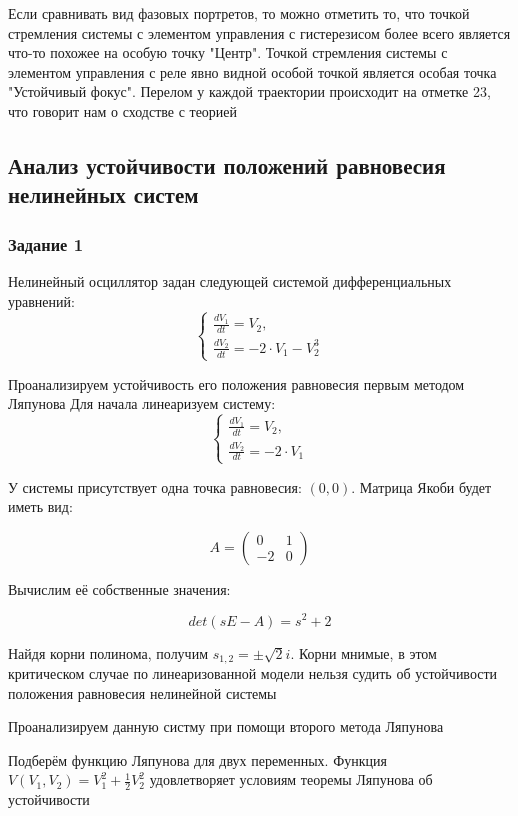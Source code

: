 Если сравнивать вид фазовых портретов, то можно отметить то, что точкой стремления системы с элементом управления
с гистерезисом более всего является что-то похожее на особую точку "Центр". Точкой стремления системы с элементом управления
с реле явно видной особой точкой является особая точка "Устойчивый фокус". Перелом у каждой траектории
происходит на отметке 23, что говорит нам о сходстве с теорией

\subsection{Анализ устойчивости положений равновесия нелинейных систем}

\subsubsection{Задание 1}

Нелинейный осциллятор задан следующей системой дифференциальных уравнений:
$$
\begin{cases}
	\frac{dV_1}{dt} = V_2, \\
	\frac{dV_2}{dt} = -2 \cdot V_1 -V_2^3
\end{cases}
$$

Проанализируем устойчивость его положения равновесия первым методом Ляпунова
Для начала линеаризуем систему:
$$
\begin{cases}
	\frac{dV_1}{dt} = V_2, \\
	\frac{dV_2}{dt} = -2 \cdot V_1
\end{cases}
$$

У системы присутствует одна точка равновесия: $(0, 0)$.
Матрица Якоби будет иметь вид:

$$
A = 
\begin{pmatrix}
	0 & 1 \\
	-2 & 0
\end{pmatrix}
$$

Вычислим её собственные значения:

$$
det(sE - A) = s^2 + 2
$$

Найдя корни полинома, получим $s_{1,2} = \pm \sqrt2i$.
Корни мнимые, в этом критическом случае по линеаризованной модели нельзя судить
об устойчивости положения равновесия нелинейной системы

Проанализируем данную систму при помощи второго метода Ляпунова

Подберём функцию Ляпунова для двух переменных. Функция $V(V_1,V_2) = V_1 ^2 + \frac{1}{2}V_2 ^2$
удовлетворяет условиям теоремы Ляпунова об устойчивости

